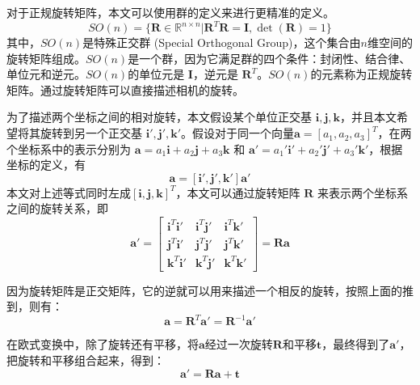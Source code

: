 对于正规旋转矩阵，本文可以使用群的定义来进行更精准的定义。
\begin{equation}
    SO(n) = \{\boldsymbol{R} \in \mathbb{R}^{n \times n} | \boldsymbol{R}^T\boldsymbol{R} = \boldsymbol{I}, \det (\boldsymbol{R}) = 1\}
\end{equation}
其中，$SO(n)$是特殊正交群 (Special Orthogonal Group)，这个集合由$n$维空间的旋转矩阵组成。$SO(n)$是一个群，因为它满足群的四个条件：封闭性、结合律、单位元和逆元。$SO(n)$的单位元是 $\boldsymbol{I}$，逆元是 $\boldsymbol{R}^T$。$SO(n)$的元素称为正规旋转矩阵。通过旋转矩阵可以直接描述相机的旋转。

为了描述两个坐标之间的相对旋转，本文假设某个单位正交基 $\boldsymbol{i}, \boldsymbol{j}, \boldsymbol{k}$，并且本文希望将其旋转到另一个正交基 $\boldsymbol{i}', \boldsymbol{j}', \boldsymbol{k}'$。假设对于同一个向量$\boldsymbol{a} = [a_1, a_2, a_3]^T$，在两个坐标系中的表示分别为 $\boldsymbol{a} = a_1\boldsymbol{i} + a_2\boldsymbol{j} + a_3\boldsymbol{k}$ 和 $\boldsymbol{a}' = a_1'\boldsymbol{i}' + a_2'\boldsymbol{j}' + a_3'\boldsymbol{k}'$，根据坐标的定义，有
\begin{equation}
    [\boldsymbol{i}, \boldsymbol{j}, \boldsymbol{k}] \boldsymbol{a} = [\boldsymbol{i}', \boldsymbol{j}', \boldsymbol{k}'] \boldsymbol{a}'
\end{equation}
本文对上述等式同时左成$[\boldsymbol{i}, \boldsymbol{j}, \boldsymbol{k}]^T$，本文可以通过旋转矩阵 $\boldsymbol{R}$ 来表示两个坐标系之间的旋转关系，即
\begin{equation}
    \boldsymbol{a}' = 
    \begin{bmatrix}
    \boldsymbol{i}^T \boldsymbol{i}' & \boldsymbol{i}^T \boldsymbol{j}' & \boldsymbol{i}^T \boldsymbol{k}' \\
    \boldsymbol{j}^T \boldsymbol{i}' & \boldsymbol{j}^T \boldsymbol{j}' & \boldsymbol{j}^T \boldsymbol{k}' \\
    \boldsymbol{k}^T \boldsymbol{i}' & \boldsymbol{k}^T \boldsymbol{j}' & \boldsymbol{k}^T \boldsymbol{k}'
    \end{bmatrix}
    =
    \boldsymbol{R} \boldsymbol{a}
\end{equation}

因为旋转矩阵是正交矩阵，它的逆就可以用来描述一个相反的旋转，按照上面的推到，则有：
\begin{equation}
    \boldsymbol{a} = \boldsymbol{R}^T \boldsymbol{a}' = \boldsymbol{R}^{-1} \boldsymbol{a}'
\end{equation}

在欧式变换中，除了旋转还有平移，将$\boldsymbol{a}$经过一次旋转$\boldsymbol{R}$和平移$\boldsymbol{t}$，最终得到了$\boldsymbol{a}'$，把旋转和平移组合起来，得到：
\begin{equation}
    \boldsymbol{a}' = \boldsymbol{R} \boldsymbol{a} + \boldsymbol{t}
    \label{eq:rotation_translation}
\end{equation}

